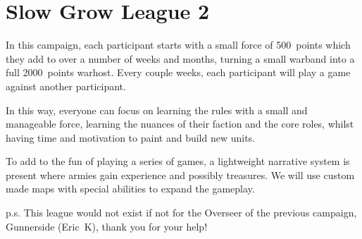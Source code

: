 \section{Slow Grow League 2}

In this campaign, each participant starts with a small force of 500~points which they add to over a number of weeks and months, 
turning a small warband into a full 2000~points warhost. 
Every couple weeks, each participant will play a game against another participant.

In this way, everyone can focus on learning the rules with a small and manageable force, 
learning the nuances of their faction and the core roles, whilst having time and motivation to paint and build new units.

To add to the fun of playing a series of games, a lightweight narrative system is present 
where armies gain experience and possibly treasures. We will use custom made maps with special abilities to expand the gameplay.

p.s. This league would not exist if not for the Overseer of the previous campaign, Gunnerside (Eric~K), thank you for your help!